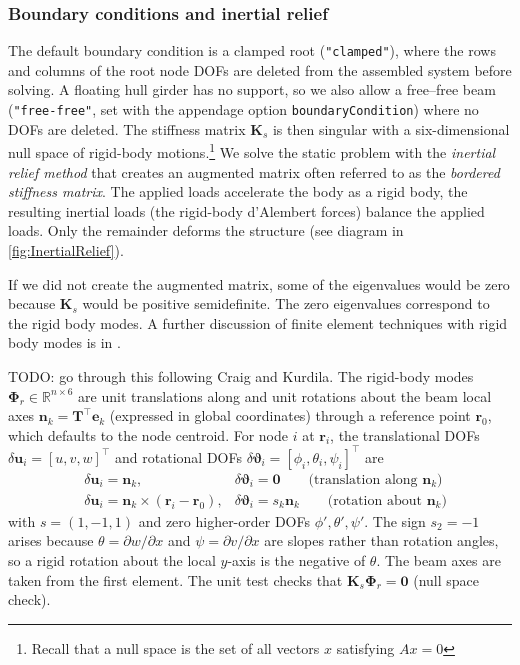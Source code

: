 \documentclass[10pt]{article}
\newcommand{\mb}[1]{\boldsymbol{\mathbf{#1}}} %
\newcommand{\mbf}[1]{\mathbf{#1}}
\newcommand{\mbs}[1]{\boldsymbol{#1}}
\newcommand{\be}{\begin{eqnarray}}
\newcommand{\ee}{\end{eqnarray}}
\newcommand{\tn}[1]{\textrm{#1}}
\begin{document}
\subsubsection{Boundary conditions and inertial relief}
%
The default boundary condition is a clamped root (\texttt{"clamped"}), where the rows and columns of the root node \acp{DOF} are deleted from the assembled system before solving.
A floating hull girder has no support, so we also allow a free--free beam (\texttt{"free-free"}, set with the appendage option \texttt{boundaryCondition}) where no \acp{DOF} are deleted.
The stiffness matrix $\mbf{K}_s$ is then singular with a six-dimensional null space of rigid-body motions.\footnote{%
Recall that a null space is the set of all vectors $x$ satisfying $Ax=0$} 
We solve the static problem with the \emph{inertial relief method} that creates an augmented matrix often referred to as the \emph{bordered stiffness matrix}.
The applied loads accelerate the body as a rigid body, the resulting inertial loads (the rigid-body d'Alembert forces) balance the applied loads.
Only the remainder deforms the structure (see diagram in \autoref{fig:InertialRelief}).

If we did not create the augmented matrix, some of the eigenvalues would be zero because $\mb{K}_s$ would be positive semidefinite.
The zero eigenvalues correspond to the rigid body modes.
A further discussion of finite element techniques with rigid body modes is in \citet[Sec. 17.3]{Craig2006}.

TODO: go through this following Craig and Kurdila.
The rigid-body modes $\mbf{\Phi}_r \in \mathbb{R}^{n \times 6}$ are unit translations along and unit rotations about the beam local axes $\mbf{n}_k = \mbf{T}^{\top} \mbf{e}_k$ (expressed in global coordinates) through a reference point $\mbf{r}_0$, which defaults to the node centroid.
For node $i$ at $\mbf{r}_i$, the translational \acp{DOF} $\delta \mbf{u}_i=[u, v, w]^\top$ and rotational \acp{DOF} $\delta \mbs{\vartheta}_i = [\phi_i, \theta_i, \psi_i]^{\top}$ are
\be
& \delta \mbf{u}_i = \mbf{n}_k, & \delta \mbs{\vartheta}_i = \mbf{0} \qquad \tn{(translation along } \mbf{n}_k \tn{)}
\\
& \delta \mbf{u}_i = \mbf{n}_k \times \left(\mbf{r}_i - \mbf{r}_0\right), & \delta \mbs{\vartheta}_i = s_k \mbf{n}_k \qquad \tn{(rotation about } \mbf{n}_k \tn{)}
\ee
with $s = (1, -1, 1)$ and zero higher-order \acp{DOF} $\phi', \theta', \psi'$.
The sign $s_2 = -1$ arises because $\theta = \partial w / \partial x$ and $\psi = \partial v / \partial x$ are slopes rather than rotation angles, so a rigid rotation about the local $y$-axis is the negative of $\theta$.
The beam axes are taken from the first element.
The unit test checks that $\mbf{K}_s \mbf{\Phi}_r = \mbf{0}$ (null space check).
\end{document}
